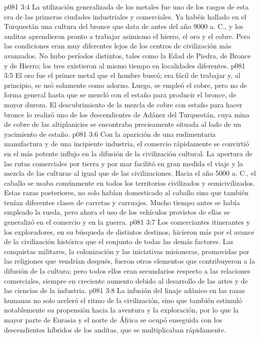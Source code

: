 \vs p081 3:4 \pc La utilización generalizada de los metales fue uno de los rasgos de esta era de las primeras ciudades industriales y comerciales. Ya habéis hallado en el Turquestán una cultura del bronce que data de antes del año 9000 a. C., y los anditas aprendieron pronto a trabajar asimismo el hierro, el oro y el cobre. Pero las condiciones eran muy diferentes lejos de los centros de civilización más avanzados. No hubo períodos distintos, tales como la Edad de Piedra, de Bronce y de Hierro; los tres existieron al mismo tiempo en localidades diferentes.
\vs p081 3:5 El oro fue el primer metal que el hombre buscó; era fácil de trabajar y, al principio, se usó solamente como adorno. Luego, se empleó el cobre, pero no de forma general hasta que se mezcló con el estaño para producir el bronce, de mayor dureza. El descubrimiento de la mezcla de cobre con estaño para hacer bronce lo realizó uno de los descendientes de Adánez del Turquestán, cuya mina de cobre de las altiplanicies se encontraba precisamente situada al lado de un yacimiento de estaño.
\vs p081 3:6 \pc Con la aparición de una rudimentaria manufactura y de una incipiente industria, el comercio rápidamente se convirtió en el más potente influjo en la difusión de la civilización cultural. La apertura de las rutas comerciales por tierra y por mar facilitó en gran medida el viaje y la mezcla de las culturas al igual que de las civilizaciones. Hacia el año 5000 a. C., el caballo se usaba comúnmente en todos los territorios civilizados y semicivilizados. Estas razas posteriores, no solo habían domesticado al caballo sino que también tenían diferentes clases de carretas y carruajes. Mucho tiempo antes se había empleado la rueda, pero ahora el uso de los vehículos provistos de ellas se generalizó en el comercio y en la guerra.
\vs p081 3:7 Los comerciantes itinerantes y los exploradores, en su búsqueda de distintos destinos, hicieron más por el avance de la civilización histórica que el conjunto de todas las demás factores. Las conquistas militares, la colonización y las iniciativas misioneras, promovidas por las religiones que vendrían después, fueron otros elementos que contribuyeron a la difusión de la cultura; pero todos ellos eran secundarios respecto a las relaciones comerciales, siempre en creciente aumento debido al desarrollo de las artes y de las ciencias de la industria.
\vs p081 3:8 La infusión del linaje adánico en las razas humanas no solo aceleró el ritmo de la civilización, sino que también estimuló notablemente su propensión hacia la aventura y la exploración, por lo que la mayor parte de Eurasia y el norte de África se ocupó enseguida con los descendientes híbridos de los anditas, que se multiplicaban rápidamente.
